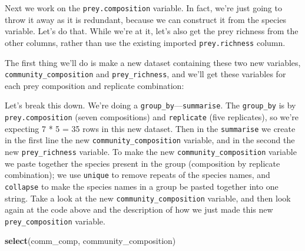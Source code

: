 \documentclass[]{book}
\newenvironment{Shaded}{\begin{snugshade}}{\end{snugshade}}
\newcommand{\DataTypeTok}[1]{\textcolor[rgb]{0.13,0.29,0.53}{#1}}
\newcommand{\DecValTok}[1]{\textcolor[rgb]{0.00,0.00,0.81}{#1}}
\newcommand{\KeywordTok}[1]{\textcolor[rgb]{0.13,0.29,0.53}{\textbf{#1}}}
\newcommand{\NormalTok}[1]{#1}
\newcommand{\OperatorTok}[1]{\textcolor[rgb]{0.81,0.36,0.00}{\textbf{#1}}}
\newcommand{\StringTok}[1]{\textcolor[rgb]{0.31,0.60,0.02}{#1}}
\begin{document}
Next we work on the \texttt{prey.composition} variable. In fact, we're just going to throw it away as it is redundant, because we can construct it from the species variable. Let's do that. While we're at it, let's also get the prey richness from the other columns, rather than use the existing imported \texttt{prey.richness} column.

The first thing we'll do is make a new dataset containing these two new variables, \texttt{community\_composition} and \texttt{prey\_richness}, and we'll get these variables for each prey composition and replicate combination:

\begin{Shaded}
\end{Shaded}

Let's break this down. We're doing a \texttt{group\_by}---\texttt{summarise}. The \texttt{group\_by} is by \texttt{prey.composition} (seven compositions) and \texttt{replicate} (five replicates), so we're expecting 7 * 5 = 35 rows in this new dataset. Then in the \texttt{summarise} we create in the first line the new \texttt{community\_composition} variable, and in the second the new \texttt{prey\_richness} variable. To make the new \texttt{community\_composition} variable we paste together the species present in the group (composition by replicate combination); we use \texttt{unique} to remove repeats of the species names, and \texttt{collapse} to make the species names in a group be pasted together into one string. Take a look at the new \texttt{community\_composition} variable, and then look again at the code above and the description of how we just made this new \texttt{prey\_composition} variable.

\begin{Shaded}
\begin{Highlighting}[]
\KeywordTok{select}\NormalTok{(comm_comp, community_composition)}
\end{Highlighting}
\end{Shaded}
\end{document}
